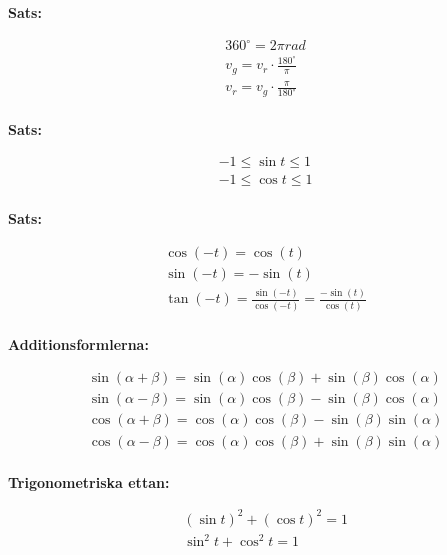 \newpage

\begin{multicols}{2}
\textbf{Sats:}\par
\begin{align*}
  &360^\circ = 2\pi rad \\
  &v_{g} = v_{r} \cdot \frac{180^\circ}{\pi} \\
  &v_{r} = v_{g} \cdot \frac{\pi}{180^\circ} \\
\end{align*}

\textbf{Sats:}\par
\begin{align*}
  &-1 \leq \sin{t} \leq 1 \\
  &-1 \leq \cos{t} \leq 1 \\
\end{align*}

\textbf{Sats:}\par
\begin{align*}
  &\cos{(-t)} = \cos{(t)} \\
  &\sin{(-t)} = -\sin{(t)} \\
  &\tan{(-t)} = \frac{\sin{(-t)}}{\cos{(-t)}} = \frac{-\sin{(t)}}{\cos{(t)}} \\
\end{align*}

\textbf{Additionsformlerna:}\par
\begin{align*}
  &\sin{(\alpha + \beta)} = \sin{(\alpha)}\cos{(\beta)} + \sin{(\beta)}\cos{(\alpha)} \\
  &\sin{(\alpha - \beta)} = \sin{(\alpha)}\cos{(\beta)} - \sin{(\beta)}\cos{(\alpha)} \\
  &\cos{(\alpha + \beta)} = \cos{(\alpha)}\cos{(\beta)} - \sin{(\beta)}\sin{(\alpha)} \\
  &\cos{(\alpha - \beta)} = \cos{(\alpha)}\cos{(\beta)} + \sin{(\beta)}\sin{(\alpha)} \\ 
\end{align*}

\textbf{Trigonometriska ettan:}\par
\begin{align*}
  &(\sin{t})^{2} + (\cos{t})^{2} = 1 \\
  &\sin^{2}{t} + \cos^{2}{t} = 1 \\ 
\end{align*}



\end{multicols}
